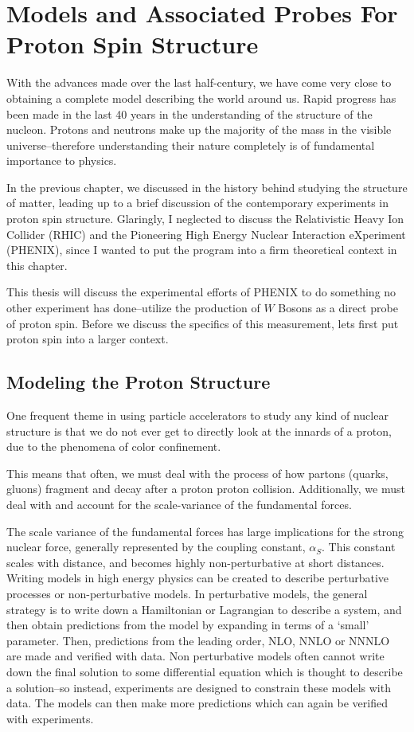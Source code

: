 \chapter{Models and Associated Probes For Proton Spin Structure}
\label{ch:modeling_proton_spin}

With the advances made over the last half-century, we have come very close to
obtaining a complete model describing the world around us.  Rapid progress has
been made in the last 40 years in the understanding of the structure of the
nucleon. Protons and neutrons make up the majority of the mass in the visible
universe--therefore understanding their nature completely is of fundamental
importance to physics.

In the previous chapter, we discussed in the history behind studying the
structure of matter, leading up to a brief discussion of the contemporary
experiments in proton spin structure. Glaringly, I neglected to discuss the
Relativistic Heavy Ion Collider (RHIC) and the Pioneering High Energy Nuclear
Interaction eXperiment (PHENIX), since I wanted to put the program into a firm
theoretical context in this chapter.

This thesis will discuss the experimental efforts of PHENIX to do something no
other experiment has done--utilize the production of $W$ Bosons as a direct probe
of proton spin. Before we discuss the specifics of this measurement, lets first
put proton spin into a larger context.

\section{Modeling the Proton Structure}

One frequent theme in using particle accelerators to study any kind of nuclear
structure is that we do not ever get to directly look at the innards of a
proton, due to the phenomena of color confinement. 

This means that often, we must deal with the process of how partons (quarks,
gluons) fragment and decay after a proton proton collision. Additionally, we
must deal with and account for the scale-variance of the fundamental forces. 

The scale variance of the fundamental forces has large implications for the
strong nuclear force, generally represented by the coupling constant,
$\alpha_S$. This constant scales with distance, and becomes highly
non-perturbative at short distances. Writing models in high energy physics can
be created to describe perturbative processes or non-perturbative models.  In
perturbative models, the general strategy is to write down a Hamiltonian or
Lagrangian to describe a system, and then obtain predictions from the model by
expanding in terms of a `small' parameter. Then, predictions from the leading
order, NLO, NNLO or NNNLO are made and verified with data. Non perturbative
models often cannot write down the final solution to some differential equation
which is thought to describe a solution--so instead, experiments are designed
to constrain these models with data. The models can then make more predictions
which can again be verified with experiments. 

